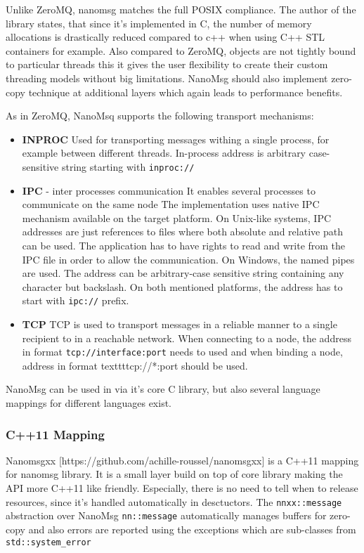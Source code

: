 Unlike ZeroMQ, nanomsg matches the full POSIX compliance. The author of the library states, that since it's implemented in C, the number of memory allocations is drastically reduced compared to c++ when using C++ STL containers for example. Also compared to ZeroMQ, objects are not tightly bound to particular threads this it gives the user flexibility to create their custom threading models without big limitations. NanoMsg should also implement zero-copy technique at additional layers which again leads to performance benefits.

As in ZeroMQ, NanoMsq supports the following transport mechanisms:
\begin{itemize}
	\item \textbf{INPROC}
	Used for transporting messages withing a single process, for example between different threads. In-process address is arbitrary case-sensitive string starting with \texttt{inproc://}
	\item \textbf{IPC} - inter processes communication
	It enables several processes to communicate on the same node
	The implementation uses native IPC mechanism available on the target platform. On Unix-like systems, IPC addresses are just references to files where both absolute and relative path can be used. The application has to have rights to read and write from the IPC file in order to allow the communication.
	On Windows, the named pipes are used. The address can be arbitrary-case sensitive string containing any character but backslash. On both mentioned platforms, the address has to start with \texttt{ipc://} prefix.
	\item \textbf{TCP}
	TCP is used to transport messages in a reliable manner to a single recipient to in a reachable network. When connecting to a node, the address in format \texttt{tcp://interface:port} needs to used and when binding a node, address in format texttt{tcp://*:port} should be used.
\end{itemize}

NanoMsg can be used in via it's core C library, but also several language mappings for different languages exist.
\subsubsection{C++11 Mapping}
Nanomsgxx [https://github.com/achille-roussel/nanomsgxx] is a C++11 mapping for nanomsg library. It is a small layer build on top of core library making the API more C++11 like friendly. Especially, there is no need to tell when to release resources, since it's handled automatically in desctuctors. The \texttt{nnxx::message} abstraction over NanoMsg \texttt{nn::message} automatically manages buffers for zero-copy and also errors are reported using the exceptions which are sub-classes from \texttt{std::system\_error}

